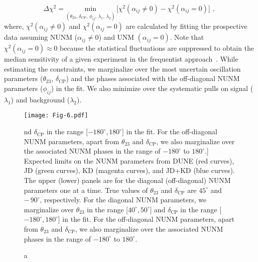 \documentclass[11pt,a4paper]{article}
\newcommand{\capdef}{}
\newcommand{\mycaption}[2][\capdef]{\renewcommand{\capdef}{#2}
	\caption[#1]{{\footnotesize #2}}}
\begin{document}
\begin{equation}
	\Delta \chi^2 = \underset{(\theta_{23},\,\delta_{\mathrm{CP}},\,\phi_{ij},\,\lambda_1,\, \lambda_2)}{\mathrm{min}} \,\bigg[\chi^2(\alpha_{ij}\neq0)-\chi^2(\alpha_{ij}=0)\bigg]\,\, ,
\end{equation}
where, $\chi^{2} (\alpha_{ij}\neq0)$ and $\chi^2(\alpha_{ij}=0)$ are calculated by fitting the prospective data assuming NUNM ($\alpha_{ij}\neq0$) and UNM $(\alpha_{ij}=0)$. Note that $\chi^2(\alpha_{ij}=0) \approx 0$ because the statistical fluctuations are suppressed to obtain the median sensitivity of a given experiment in the frequentist approach~\cite{Blennow:2013oma}. While estimating the constraints, we marginalize over the most uncertain oscillation parameters ($\theta_{23}$, $\delta_{\mathrm{CP}}$) and the phases associated with the off-diagonal NUNM parameters ($\phi_{ij}$) in the fit. We also minimize over the systematic pulls on signal ($\lambda_1$) and background ($\lambda_2$).

\begin{figure}[h!]
\centering
\texttt{[image: Fig-6.pdf]}
\mycaption{ Expected limits on the NUNM parameters
	from DUNE (red curves), JD (green curves), KD (magenta curves), and JD+KD (blue curves).
	The upper (lower) panels are for the diagonal (off-diagonal) NUNM parameters one at a time.
	True values of $\theta_{23}$ and $\delta_{\mathrm{CP}}$ are $45^{\circ}$ and $-\,90^{\circ}$, respectively. 
	For the diagonal NUNM parameters, we marginalize over $\theta_{23}$ in the range [$40^{\circ},   50^{\circ}$] and $\delta_{\mathrm{CP}}$ in the range [$-180^{\circ}, 180^{\circ}$] in the fit. For the off-diagonal NUNM parameters, apart from $\theta_{23}$ and $\delta_{\mathrm{CP}}$, we also marginalize over the associated NUNM phases in the range of $-180^{\circ}$ to $180^{\circ}$.}
\label{fig:chi_sq}
\end{figure}
\end{document}
